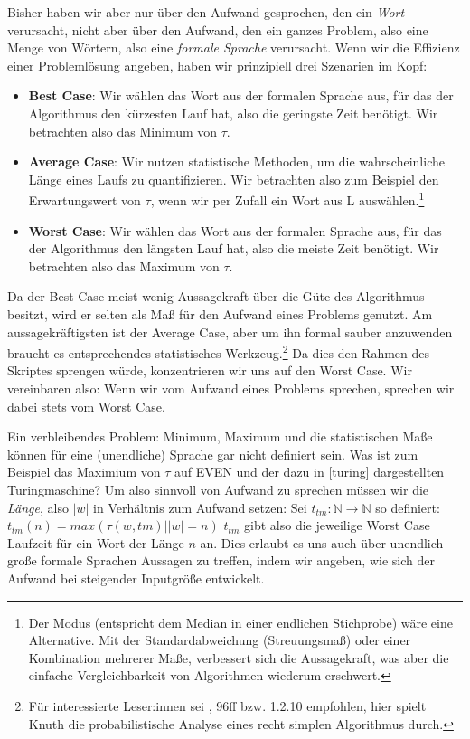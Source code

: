Bisher haben wir aber nur über den Aufwand gesprochen,
den ein \emph{Wort} verursacht,
nicht aber über den Aufwand,
den ein ganzes Problem, also eine Menge von Wörtern,
also eine \emph{formale Sprache} verursacht.
Wenn wir die Effizienz einer Problemlösung angeben,
haben wir prinzipiell drei Szenarien im Kopf:
\begin{itemize}
    \item \textbf{Best Case}: Wir wählen das Wort aus der formalen Sprache aus,
        für das der Algorithmus den kürzesten Lauf hat,
        also die geringste Zeit benötigt.
        Wir betrachten also das Minimum von $\tau$.
    \item \textbf{Average Case}: Wir nutzen statistische Methoden,
        um die wahrscheinliche Länge eines Laufs zu quantifizieren.
        Wir betrachten also zum Beispiel den Erwartungswert von $\tau$,
        wenn wir per Zufall ein Wort aus L auswählen.\footnote{
            Der Modus (entspricht dem Median in einer endlichen Stichprobe) wäre eine Alternative.
        Mit der Standardabweichung (Streuungsmaß) oder einer Kombination mehrerer Maße,
        verbessert sich die Aussagekraft,
        was aber die einfache Vergleichbarkeit von Algorithmen wiederum erschwert.}
    \item \textbf{Worst Case}: Wir wählen das Wort aus der formalen Sprache aus,
        für das der Algorithmus den längsten Lauf hat,
        also die meiste Zeit benötigt.
        Wir betrachten also das Maximum von $\tau$. 
\end{itemize} 

Da der Best Case meist wenig Aussagekraft über die Güte des Algorithmus besitzt,
wird er selten als Maß für den Aufwand eines Problems genutzt.
Am aussagekräftigsten ist der Average Case,
aber um ihn formal sauber anzuwenden braucht es
entsprechendes statistisches Werkzeug.\footnote{
    Für interessierte Leser:innen sei \cite{knuth1}, 96ff bzw. 1.2.10 empfohlen,
    hier spielt Knuth die probabilistische Analyse eines recht simplen Algorithmus durch.} 
Da dies den Rahmen des Skriptes sprengen würde,
konzentrieren wir uns auf den Worst Case.
Wir vereinbaren also: Wenn wir vom Aufwand eines Problems sprechen,
sprechen wir dabei stets vom Worst Case.

Ein verbleibendes Problem: Minimum, Maximum und die statistischen Maße 
können für eine (unendliche) Sprache gar nicht definiert sein.
Was ist zum Beispiel das Maximium von $\tau$ auf EVEN und der
dazu in \autoref{turing} dargestellten Turingmaschine?
Um also sinnvoll von Aufwand zu sprechen müssen wir die \emph{Länge},
also $|w|$ in Verhältnis zum Aufwand setzen:
Sei $t_{tm}: \mathbb{N} \rightarrow \mathbb{N}$ so definiert:
$t_{tm}(n) = max({\tau(w, tm)| |w| = n})$
$t_{tm}$ gibt also die jeweilige Worst Case Laufzeit für ein Wort der Länge $n$ an.
Dies erlaubt es uns auch über unendlich große formale Sprachen Aussagen zu treffen,
indem wir angeben, wie sich der Aufwand bei steigender Inputgröße entwickelt.

